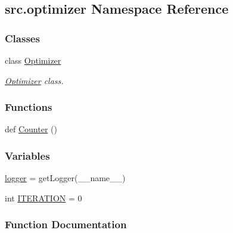 \hypertarget{namespacesrc_1_1optimizer}{}\subsection{src.\+optimizer Namespace Reference}
\label{namespacesrc_1_1optimizer}
\subsubsection*{Classes}
\begin{DoxyCompactItemize}
\item 
class \hyperlink{classsrc_1_1optimizer_1_1Optimizer}{Optimizer}
\begin{DoxyCompactList}\small\item\em \hyperlink{classsrc_1_1optimizer_1_1Optimizer}{Optimizer} class. \end{DoxyCompactList}\end{DoxyCompactItemize}
\subsubsection*{Functions}
\begin{DoxyCompactItemize}
\item 
def \hyperlink{namespacesrc_1_1optimizer_abd36f93a9b1e0d51b4d693687b9a8f33}{Counter} ()
\end{DoxyCompactItemize}
\subsubsection*{Variables}
\begin{DoxyCompactItemize}
\item 
\hyperlink{namespacesrc_1_1optimizer_a6c5ebe2ba6e560bc794c92485c5acfa8}{logger} = get\+Logger(\+\_\+\+\_\+name\+\_\+\+\_\+)
\item 
int \hyperlink{namespacesrc_1_1optimizer_a2840034b3c8de5e870ef0a94f2bee036}{I\+T\+E\+R\+A\+T\+I\+ON} = 0
\end{DoxyCompactItemize}


\subsubsection{Function Documentation}
\mbox{\label{namespacesrc_1_1optimizer_abd36f93a9b1e0d51b4d693687b9a8f33}} 
